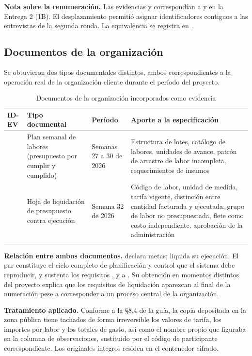 \noindent
\textbf{Nota sobre la renumeración.} Las evidencias  y  correspondían a
 y  en la Entrega 2 (1B). El desplazamiento permitió asignar identificadores
contiguos a las entrevistas de la segunda ronda. La equivalencia se registra en .

\subsection{Documentos de la organización}

Se obtuvieron dos tipos documentales distintos, ambos correspondientes a la operación real de la
organización cliente durante el período del proyecto.

\begin{longtable}{|C{1.4cm}|L{4.2cm}|C{2.4cm}|L{6.4cm}|}
\hline
{}\textbf{ID-EV} & \textbf{Tipo documental} & \textbf{Período} & \textbf{Aporte a la especificación} \\
\hline
\endhead
{} & Plan semanal de labores (presupuesto por cumplir y cumplido) & Semanas 27 a 30 de 2026 & Estructura de lotes, catálogo de labores, unidades de avance, patrón de arrastre de labor incompleta, requerimientos de insumos \\ \hline
{} & Hoja de liquidación de presupuesto contra ejecución & Semana 32 de 2026 & Código de labor, unidad de medida, tarifa vigente, distinción entre cantidad facturada y ejecutada, grupo de labor no presupuestada, flete como costo independiente, aprobación de la administración \\ \hline
\caption{Documentos de la organización incorporados como evidencia}
\end{longtable}

\noindent
\textbf{Relación entre ambos documentos.}  declara metas;  liquida su ejecución.
El par constituye el ciclo completo de planificación y control que el sistema debe reproducir, y
sustenta los requisitos ,  y  a . Su obtención en momentos
distintos del proyecto explica que los requisitos de liquidación aparezcan al final de la numeración
pese a corresponder a un proceso central de la organización.

\noindent
\textbf{Tratamiento aplicado.} Conforme a la §8.4 de la guía, la copia depositada en la zona pública
tiene tachados de forma irreversible los valores de tarifa, los importes por labor y los totales de
gasto, así como el nombre propio que figuraba en la columna de observaciones, sustituido por el
código de participante correspondiente. Los originales íntegros residen en el contenedor cifrado.

